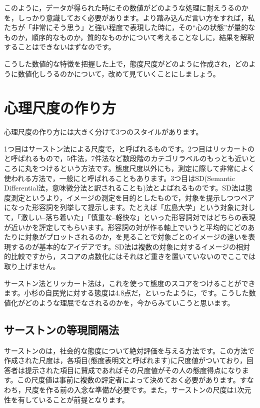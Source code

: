 \documentclass{ltjsbook}
\begin{document}
このように，データが得られた時にその数値がどのような処理に耐えうるのかを，しっかり意識しておく必要があります。より踏み込んだ言い方をすれば，私たちが「非常にそう思う」と強い程度で表現した時に，その``心の状態''が量的なものか，順序的なものか，質的なものかについて考えることなしに，結果を解釈することはできないはずなのです。

こうした数値的な特徴を把握した上で，態度尺度がどのように作成され，どのように数値化しうるのかについて，改めて見ていくことにしましょう。


\section{心理尺度の作り方}
心理尺度の作り方には大きく分けて3つのスタイルがあります。

1つ目はサーストン法による尺度で，と呼ばれるものです。2つ目はリッカートのと呼ばれるもので，5件法，7件法など数段階のカテゴリラベルのもっとも近いところに丸をつけるという方法です。態度尺度以外にも，測定に際して非常によく使われる方法で，一般にと呼ばれることもあります。3つ目はSD(Semantic Differential法，意味微分法と訳されることも)法とよばれるものです。SD法は態度測定というより，イメージの測定を目的としたもので，対象を提示しつつペアになった形容詞を列挙して提示します。たとえば「広島大学」という対象に対して，「激しい--落ち着いた」「慎重な--軽快な」といった形容詞対ではどちらの表現が近いかを評定してもらいます。形容詞の対が作る軸上でいうと平均的にどのあたりに対象がプロットされるのか，を見ることで対象ごとのイメージの違いを表現するのが基本的なアイデアです。SD法は複数の対象に対するイメージの相対的比較ですから，スコアの点数化にはそれほど重きを置いていないのでここでは取り上げません。

サーストン法とリッカート法は，これを使って態度のスコアをつけることができます。小杉の自民党に対する態度は4.8点だ，といったように，です。こうした数値化がどのような理屈でなされるのかを，今からみていこうと思います。

\subsection{サーストンの等現間隔法}
\label{ThurstoneScale}
サーストンのは，社会的な態度について絶対評価を与える方法です。この方法で作成された尺度は，各項目(態度表明文と呼ばれます)に尺度値がついており，回答者は提示された項目に賛成であればその尺度値がその人の態度得点になります。この尺度値は事前に複数の評定者によって決めておく必要があります。すなわち，尺度を作る前の入念な準備が必要です。また，サーストンの尺度は1次元性を有していることが前提となります。
\end{document}

